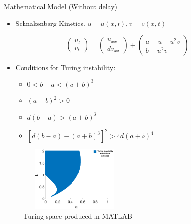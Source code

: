 \documentclass{beamer}
\begin{document}
\begin{frame}{Mathematical Model (Without delay)}
        \begin{itemize}
            \item Schnakenberg Kinetics. $u=u(x,t), v=v(x,t)$.
        \end{itemize}
            \begin{equation}
                \begin{pmatrix}
                    u_t\\
                    v_t
                \end{pmatrix}
                =
                \begin{pmatrix}
                    u_{xx}\\
                    dv_{xx}
                \end{pmatrix}
                +
                \begin{pmatrix}
                    a-u+u^2v\\
                    b-u^2v
                \end{pmatrix}
            \end{equation}

            \begin{itemize}
                \item Conditions for Turing instability:
                \begin{itemize}
                    \item $0<b-a<(a+b)^3$
                    \item $(a+b)^2>0$
                    \item $d(b-a)>(a+b)^3$
                    \item $\left[d(b-a)-(a+b)^3\right]^2>4d(a+b)^4$
                \end{itemize}
            \end{itemize}
            \begin{figure}[H]
                \centering
                    \includegraphics[width=5.5cm,height=3.2cm]{tspace.png}
                    \caption{Turing space produced in MATLAB}
            \end{figure}

\end{frame}
\end{document}
